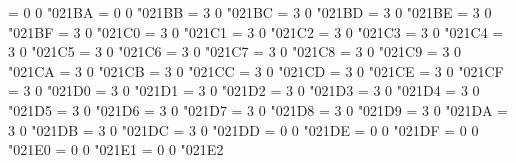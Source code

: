 \Umathchardef\acwopencirclearrow = 0 0 "021BA %
\Umathchardef\cwopencirclearrow = 0 0 "021BB %
\Umathchardef\leftharpoonup = 3 0 "021BC %
\Umathchardef\leftharpoondown = 3 0 "021BD %
\Umathchardef\upharpoonright = 3 0 "021BE %
\Umathchardef\upharpoonleft = 3 0 "021BF %
\Umathchardef\rightharpoonup = 3 0 "021C0 %
\Umathchardef\rightharpoondown = 3 0 "021C1 %
\Umathchardef\downharpoonright = 3 0 "021C2 %
\Umathchardef\downharpoonleft = 3 0 "021C3 %
\Umathchardef\rightleftarrows = 3 0 "021C4 %
\Umathchardef\updownarrows = 3 0 "021C5 %
\Umathchardef\leftrightarrows = 3 0 "021C6 %
\Umathchardef\leftleftarrows = 3 0 "021C7 %
\Umathchardef\upuparrows = 3 0 "021C8 %
\Umathchardef\rightrightarrows = 3 0 "021C9 %
\Umathchardef\downdownarrows = 3 0 "021CA %
\Umathchardef\leftrightharpoons = 3 0 "021CB %
\Umathchardef\rightleftharpoons = 3 0 "021CC %
\Umathchardef\nLeftarrow = 3 0 "021CD %
\Umathchardef\nLeftrightarrow = 3 0 "021CE %
\Umathchardef\nRightarrow = 3 0 "021CF %
\Umathchardef\Leftarrow = 3 0 "021D0 %
\Umathchardef\Uparrow = 3 0 "021D1 %
\Umathchardef\Rightarrow = 3 0 "021D2 %
\Umathchardef\Downarrow = 3 0 "021D3 %
\Umathchardef\Leftrightarrow = 3 0 "021D4 %
\Umathchardef\Updownarrow = 3 0 "021D5 %
\Umathchardef\Nwarrow = 3 0 "021D6 %
\Umathchardef\Nearrow = 3 0 "021D7 %
\Umathchardef\Searrow = 3 0 "021D8 %
\Umathchardef\Swarrow = 3 0 "021D9 %
\Umathchardef\Lleftarrow = 3 0 "021DA %
\Umathchardef\Rrightarrow = 3 0 "021DB %
\Umathchardef\leftsquigarrow = 3 0 "021DC %
\Umathchardef\rightsquigarrow = 3 0 "021DD %
\Umathchardef\nHuparrow = 0 0 "021DE %
\Umathchardef\nHdownarrow = 0 0 "021DF %
\Umathchardef\leftdasharrow = 0 0 "021E0 %
\Umathchardef\updasharrow = 0 0 "021E1 %
\Umathchardef\rightdasharrow = 0 0 "021E2 %
